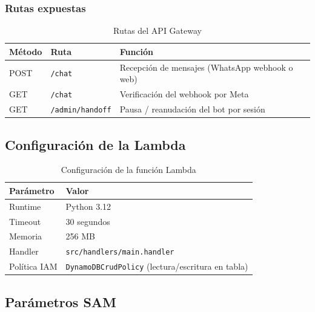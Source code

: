 \documentclass[12pt,a4paper]{article}
\begin{document}
\subsubsection*{Rutas expuestas}

\begin{table}[H]
\centering
\begin{tabular}{@{}lll@{}}
\toprule
\textbf{Método} & \textbf{Ruta} & \textbf{Función} \\
\midrule
POST & \texttt{/chat} & Recepción de mensajes (WhatsApp webhook o web) \\
GET  & \texttt{/chat} & Verificación del webhook por Meta \\
GET  & \texttt{/admin/handoff} & Pausa / reanudación del bot por sesión \\
\bottomrule
\end{tabular}
\caption{Rutas del API Gateway}
\end{table}

\subsection{Configuración de la Lambda}

\begin{table}[H]
\centering
\begin{tabular}{@{}ll@{}}
\toprule
\textbf{Parámetro} & \textbf{Valor} \\
\midrule
Runtime & Python 3.12 \\
Timeout & 30 segundos \\
Memoria & 256 MB \\
Handler & \texttt{src/handlers/main.handler} \\
Política IAM & \texttt{DynamoDBCrudPolicy} (lectura/escritura en tabla) \\
\bottomrule
\end{tabular}
\caption{Configuración de la función Lambda}
\end{table}

\subsection{Parámetros SAM}
\end{document}
